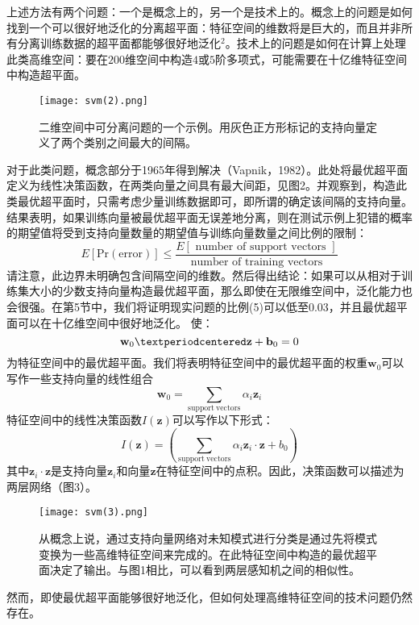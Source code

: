 \documentclass[lang=cn,11pt,a4paper]{elegantpaper}
\begin{document}
	上述方法有两个问题：一个是概念上的，另一个是技术上的。概念上的问题是如何找到一个可以很好地泛化的分离超平面：特征空间的维数将是巨大的，而且并非所有分离训练数据的超平面都能够很好地泛化$^2$。技术上的问题是如何在计算上处理此类高维空间：要在$200$维空间中构造$4$或$5$阶多项式，可能需要在十亿维特征空间中构造超平面。
	\begin{figure}[htbp]
		\centering
		\texttt{[image: svm(2).png]}
		\caption{二维空间中可分离问题的一个示例。用灰色正方形标记的支持向量定义了两个类别之间最大的间隔。}
	\end{figure}
	对于此类问题，概念部分于1965年得到解决（Vapnik，1982）。此处将最优超平面定义为线性决策函数，在两类向量之间具有最大间距，见图2。并观察到，构造此类最优超平面时，只需考虑少量训练数据即可，即所谓的确定该间隔的支持向量。结果表明，如果训练向量被最优超平面无误差地分离，则在测试示例上犯错的概率的期望值将受到支持向量数量的期望值与训练向量数量之间比例的限制：
	\begin{equation}
		E[\mathrm{Pr}(\mathrm{error})] \leq \frac{E[\text { number of support vectors }]}{\text { number of training vectors }}\tag{5}
	\end{equation}
	请注意，此边界未明确包含间隔空间的维数。然后得出结论：如果可以从相对于训练集大小的少数支持向量构造最优超平面，那么即使在无限维空间中，泛化能力也会很强。在第5节中，我们将证明现实问题的比例(5)可以低至$0.03$，并且最优超平面可以在十亿维空间中很好地泛化。
	使：
	\begin{equation}
		\mathbf{w}_0·\mathbf{z}+\mathbf{b}_0 =0\notag
	\end{equation}
	为特征空间中的最优超平面。我们将表明特征空间中的最优超平面的权重$\mathbf{w}_0$可以写作一些支持向量的线性组合
	\begin{equation}
		\mathbf{w}_0=\sum_\mathrm{support\ vectors}\alpha_i\mathbf{z}_i\tag{6}
	\end{equation}
	特征空间中的线性决策函数$I(\mathbf{z})$可以写作以下形式：
	\begin{equation}
		I(\mathbf{z})=\left(\sum_\mathrm{support\ vectors}\alpha_i\mathbf{z}_i·\mathbf{z}+b_0\right)\tag{7}
	\end{equation}
	其中$\mathbf{z}_i·\mathbf{z}$是支持向量$\mathbf{z}_i$和向量$\mathbf{z}$在特征空间中的点积。因此，决策函数可以描述为两层网络（图3）。
	\begin{figure}[htbp]
		\centering
		\texttt{[image: svm(3).png]}
		\caption{从概念上说，通过支持向量网络对未知模式进行分类是通过先将模式变换为一些高维特征空间来完成的。在此特征空间中构造的最优超平面决定了输出。与图1相比，可以看到两层感知机之间的相似性。}
	\end{figure}
	然而，即使最优超平面能够很好地泛化，但如何处理高维特征空间的技术问题仍然存在。
\end{document}
